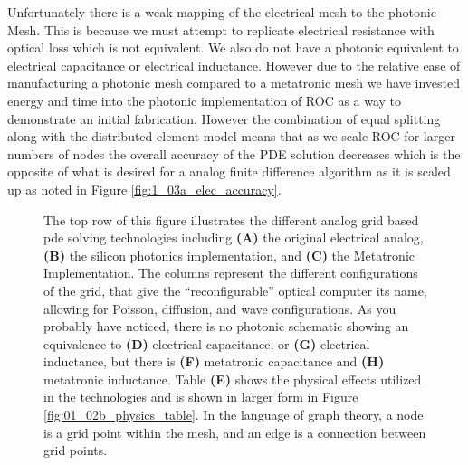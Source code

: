 \par Unfortunately there is a weak mapping of the electrical mesh to the photonic Mesh. This is because we must attempt to replicate electrical resistance with optical loss which is not equivalent. We also do not have a photonic equivalent to electrical capacitance or electrical inductance. However due to the relative ease of manufacturing a photonic mesh compared to a metatronic mesh we have invested energy and time into the photonic implementation of ROC as a way to demonstrate an initial fabrication. However the combination of equal splitting along with the distributed element model means that as we scale ROC for larger numbers of nodes the overall accuracy of the PDE solution decreases which is the opposite of what is desired for a analog finite difference algorithm as it is scaled up as noted in Figure \ref{fig:1_03a_elec_accuracy}.

\begin{figure}[ht]
\centering{}
\caption{ The top row of this figure illustrates the different analog grid based \acrshort{pde} solving technologies including \textbf{(A)} the original electrical analog, \textbf{(B)} the silicon photonics implementation, and \textbf{(C)} the Metatronic Implementation. The columns represent the different configurations of the grid, that give the “reconfigurable” optical computer its name, allowing for Poisson, diffusion, and wave configurations. 
As you probably have noticed, there is no photonic schematic showing an equivalence to \textbf{(D)} electrical capacitance, or \textbf{(G)} electrical inductance, but there is \textbf{(F)} metatronic capacitance and \textbf{(H)} metatronic inductance. Table \textbf{(E)} shows the physical effects utilized in the technologies and is shown in larger form in Figure \ref{fig:01_02b_physics_table}. In the language of graph theory, a node is a grid point within the mesh, and an edge is a connection between grid points.}
\label{fig:01_02_electrical_photoinc_metatronic}
\end{figure}

